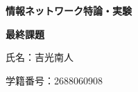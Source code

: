 
% 

\begin{titlepage}
    \centering %
    
    \vspace*{5cm} %
    
    {\Huge \bfseries 情報ネットワーク特論・実験\par}
    {\Huge \bfseries 最終課題\par}

    \vspace{4cm} %
    
    {\Large 氏名：吉光南人\par}
    
    \vspace{1cm} %

    {\Large 学籍番号：2688060908\par}
    
\end{titlepage}

\newpage

% 